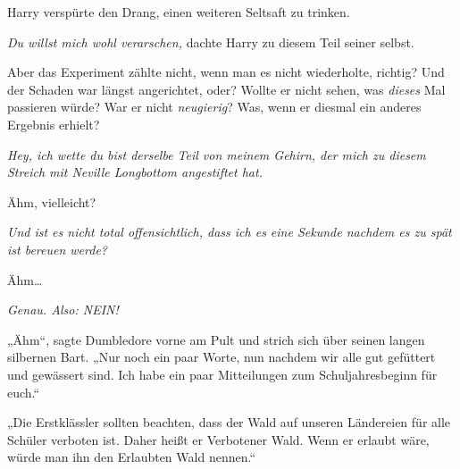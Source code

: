 Harry verspürte den Drang, einen weiteren Seltsaft zu trinken.

\emph{Du \emph{willst} mich wohl verarschen,} dachte Harry zu diesem Teil seiner selbst.

Aber das Experiment zählte nicht, wenn man es nicht wiederholte, richtig? Und der Schaden war längst angerichtet, oder? Wollte er nicht sehen, was \emph{dieses} Mal passieren würde? War er nicht \emph{neugierig}? Was, wenn er diesmal ein anderes Ergebnis erhielt?

\emph{Hey, ich wette du bist derselbe Teil von meinem Gehirn, der mich zu diesem Streich mit Neville Longbottom angestiftet hat.}

Ähm, vielleicht?

\emph{Und ist es nicht total offensichtlich, dass ich es eine Sekunde nachdem es zu spät ist bereuen werde?}


Ähm…

\emph{Genau. Also: NEIN!}

„Ähm“, sagte Dumbledore vorne am Pult und strich sich über seinen langen silbernen Bart. „Nur noch ein paar Worte, nun nachdem wir alle gut gefüttert und gewässert sind. Ich habe ein paar Mitteilungen zum Schuljahresbeginn für euch.“

„Die Erstklässler sollten beachten, dass der Wald auf unseren Ländereien für alle Schüler verboten ist. Daher heißt er Verbotener Wald. Wenn er erlaubt wäre, würde man ihn den Erlaubten Wald nennen.“

